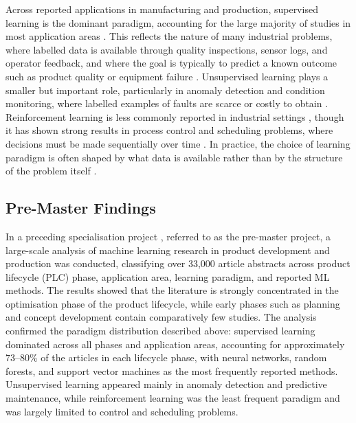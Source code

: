 Across reported applications in manufacturing and production, supervised learning 
is the dominant paradigm, accounting for the large majority of studies in most 
application areas \parencite{wuest2016ml_manufacturing, adekoya2022applications_ai_em}. 
This reflects the nature of many industrial problems, where labelled data is available 
through quality inspections, sensor logs, and operator feedback, and where the goal 
is typically to predict a known outcome such as product quality or equipment failure 
\parencite{wuest2016ml_manufacturing, presciuttini2024ml_iot_manufacturing_operations}. 
Unsupervised learning plays a smaller but important role, particularly in anomaly 
detection and condition monitoring, where labelled examples of faults are scarce or 
costly to obtain \parencite{presciuttini2024ml_iot_manufacturing_operations}. 
Reinforcement learning is less commonly reported in industrial 
settings \parencite{wuest2016ml_manufacturing}, though it has shown 
strong results in process control and scheduling problems, where 
decisions must be made sequentially over time 
\parencite{panzer2022deep_reinforcement_learning_production_systems}.
In practice, the choice of learning paradigm is often shaped by what data is available 
rather than by the structure of the problem itself 
\parencite{wuest2016ml_manufacturing}.

\subsection{Pre-Master Findings}
\label{sec:pre-master-findings}

In a preceding specialisation project \parencite{bergsto2026mlselection}, referred to as the pre-master 
project, a large-scale analysis of machine learning 
research in product development and production was conducted, classifying over 33,000 
article abstracts across product lifecycle (PLC) phase, application area, learning paradigm,
and reported ML methods. 
The results showed that the literature is strongly concentrated in the optimisation
phase of the product lifecycle, while early phases such as planning and concept 
development contain comparatively few studies. 
The analysis confirmed the paradigm distribution described above: 
supervised learning dominated across all phases and application areas, 
accounting for approximately 73--80\% of the articles in each lifecycle 
phase, with neural networks, random forests, and support vector machines 
as the most frequently reported methods. Unsupervised learning appeared 
mainly in anomaly detection and predictive maintenance, while 
reinforcement learning was the least frequent paradigm and was largely 
limited to control and scheduling problems.